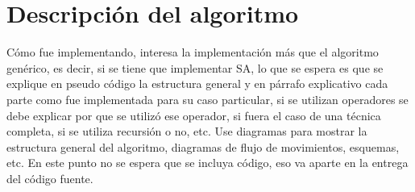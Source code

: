 \section{Descripci\'on del algoritmo}

C\'omo fue implementando, interesa la implementaci\'on m\'as que el algoritmo gen\'erico, es decir,
si se tiene que implementar SA, lo que se espera es que se explique en pseudo c\'odigo la estructura
general y en p\'arrafo explicativo cada parte como fue implementada para su caso particular, si
se utilizan operadores se debe explicar por que se utiliz\'o ese operador, si fuera el caso de una
t\'ecnica completa, si se utiliza recursi\'on o no, etc. Use diagramas para mostrar la estructura general del algoritmo, diagramas de flujo de movimientos, esquemas, etc. En este punto no se espera que se incluya c\'odigo, eso va aparte en la entrega del c\'odigo fuente.
